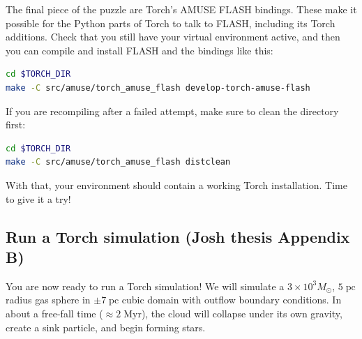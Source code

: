 \documentclass[10pt]{article}
\newcommand*{\mt}{\mathrm}
\newcommand*{\unit}[1]{\;\mt{#1}}  %
\newcommand*{\Msun}{M_\odot}
\begin{document}
The final piece of the puzzle are Torch's AMUSE FLASH bindings. These make it possible
for the Python parts of Torch to talk to FLASH, including its Torch additions. Check
that you still have your virtual environment active, and then you can compile and
install FLASH and the bindings like this:

\begin{lstlisting}[language=bash]
cd $TORCH_DIR
make -C src/amuse/torch_amuse_flash develop-torch-amuse-flash
\end{lstlisting}

If you are recompiling after a failed attempt, make sure to clean the directory first:

\begin{lstlisting}[language=bash]
cd $TORCH_DIR
make -C src/amuse/torch_amuse_flash distclean
\end{lstlisting}

With that, your environment should contain a working Torch installation. Time to give
it a try!



%
%
%


\subsection{Run a Torch simulation (Josh thesis Appendix B)}

You are now ready to run a Torch simulation!  We will simulate a
$3 \times 10^3 \Msun$, $5 \unit{pc}$ radius gas sphere in $\pm 7 \unit{pc}$
cubic domain with outflow boundary conditions.
In about a free-fall time ($\approx 2 \unit{Myr}$), the cloud will collapse
under its own gravity, create a sink particle, and begin forming stars.
\end{document}
